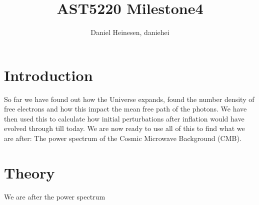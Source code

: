 \documentclass[a4paper,norsk, 10pt]{article}
\title{AST5220 Milestone4}
\author{Daniel Heinesen, daniehei}
\begin{document}
\maketitle
\section{Introduction}
So far we have found out how the Universe expands, found the number density of free electrons and how this impact the mean free path of the photons. We have then used this to calculate how initial perturbations after inflation would have evolved through till today. We are now ready to use all of this to find what we are after: The power spectrum of the Cosmic Microwave Background (CMB). 



\section{Theory}
We are after the power spectrum
\end{document}
